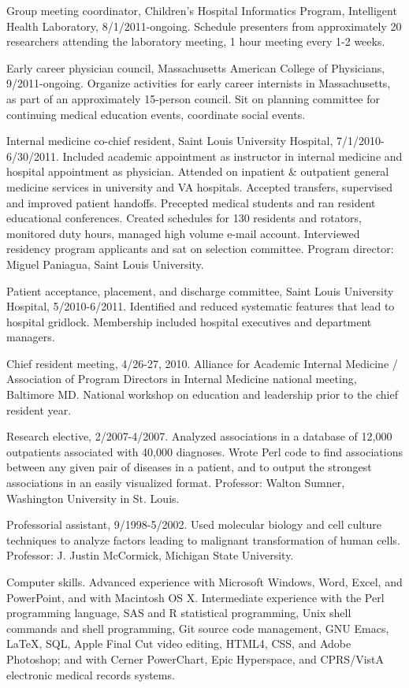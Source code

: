 \documentclass[11pt]{article}
\begin{document}
Group meeting coordinator, Children’s Hospital Informatics Program,
Intelligent Health Laboratory, 8/1/2011-ongoing. Schedule presenters
from approximately 20 researchers attending the laboratory meeting, 1
hour meeting every 1-2 weeks.

Early career physician council, Massachusetts American College of
Physicians, 9/2011-ongoing. Organize activities for early career
internists in Massachusetts, as part of an approximately 15-person
council. Sit on planning committee for continuing medical education
events, coordinate social events.

Internal medicine co-chief resident, Saint Louis University Hospital,
7/1/2010-6/30/2011. Included academic appointment as instructor in
internal medicine and hospital appointment as physician. Attended on
inpatient \& outpatient general medicine services in university and VA
hospitals. Accepted transfers, supervised and improved patient
handoffs. Precepted medical students and ran resident educational
conferences. Created schedules for 130 residents and rotators,
monitored duty hours, managed high volume e-mail account. Interviewed
residency program applicants and sat on selection committee. Program
director: Miguel Paniagua, Saint Louis University.

Patient acceptance, placement, and discharge committee, Saint Louis
University Hospital, 5/2010-6/2011. Identified and reduced systematic
features that lead to hospital gridlock. Membership included hospital
executives and department managers.

Chief resident meeting, 4/26-27, 2010. Alliance for Academic Internal
Medicine / Association of Program Directors in Internal Medicine
national meeting, Baltimore MD. National workshop on education and
leadership prior to the chief resident year.

Research elective, 2/2007-4/2007. Analyzed associations in a database
of 12,000 outpatients associated with 40,000 diagnoses. Wrote Perl
code to find associations between any given pair of diseases in a
patient, and to output the strongest associations in an easily
visualized format. Professor: Walton Sumner, Washington University in
St. Louis.

Professorial assistant, 9/1998-5/2002. Used molecular biology and cell
culture techniques to analyze factors leading to malignant
transformation of human cells. Professor: J. Justin McCormick,
Michigan State University.

Computer skills. Advanced experience with Microsoft Windows, Word,
Excel, and PowerPoint, and with Macintosh OS X. Intermediate
experience with the Perl programming language, SAS and R statistical
programming, Unix shell commands and shell programming, Git source
code management, GNU Emacs, \LaTeX, SQL, Apple Final Cut video editing,
HTML4, CSS, and Adobe Photoshop; and with Cerner PowerChart, Epic
Hyperspace, and CPRS/VistA electronic medical records systems.
\end{document}
